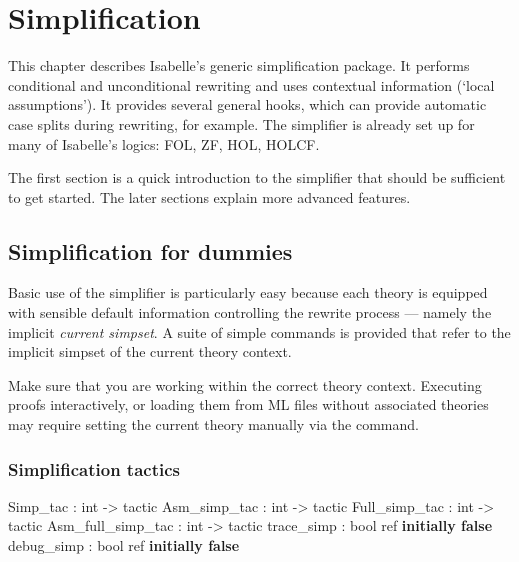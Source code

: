 
\chapter{Simplification}
\label{chap:simplification}

This chapter describes Isabelle's generic simplification package.  It performs
conditional and unconditional rewriting and uses contextual information
(`local assumptions').  It provides several general hooks, which can provide
automatic case splits during rewriting, for example.  The simplifier is
already set up for many of Isabelle's logics: FOL, ZF, HOL, HOLCF.

The first section is a quick introduction to the simplifier that
should be sufficient to get started.  The later sections explain more
advanced features.


\section{Simplification for dummies}
\label{sec:simp-for-dummies}

Basic use of the simplifier is particularly easy because each theory
is equipped with sensible default information controlling the rewrite
process --- namely the implicit {\em current
  simpset}.  A suite of simple commands is
provided that refer to the implicit simpset of the current theory
context.

\begin{warn}
  Make sure that you are working within the correct theory context.
  Executing proofs interactively, or loading them from ML files
  without associated theories may require setting the current theory
  manually via the  command.
\end{warn}

\subsection{Simplification tactics} \label{sec:simp-for-dummies-tacs}
\begin{ttbox}
Simp_tac          : int -> tactic
Asm_simp_tac      : int -> tactic
Full_simp_tac     : int -> tactic
Asm_full_simp_tac : int -> tactic
trace_simp        : bool ref \hfill{\bf initially false}
debug_simp        : bool ref \hfill{\bf initially false}
\end{ttbox}

